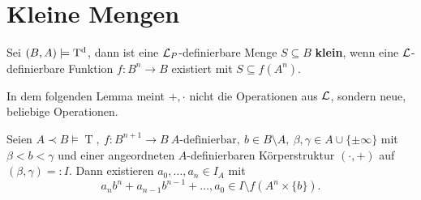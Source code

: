 \section{Kleine Mengen}
\begin{definition}
	Sei $(B,A)\models\operatorname{T^d}$, dann ist eine $\mathcal{L}_P$-definierbare Menge $S\subseteq B$ \textbf{klein}, wenn eine $\mathcal{L}$-definierbare Funktion $f:B^n\rightarrow B$ existiert mit $S\subseteq f(A^n)$.
\end{definition}

\newpage
In dem folgenden Lemma meint $+,\cdot$ nicht die Operationen aus $\mathcal{L}$, sondern neue, beliebige Operationen.

\begin{lemma}\label{Hilfsaussage Kleinheit}
	Seien $A\prec B\models\operatorname{T},\ f:B^{n+1}\rightarrow B\ A\text{-definierbar},\ b\in B\setminus A,\ \beta,\gamma\in A\cup\{\pm\infty\}$ mit $\beta<b<\gamma$ und einer angeordneten $A$-definierbaren Körperstruktur $(\cdot,+)$ auf $(\beta,\gamma)=:I$. Dann existieren $a_0,\dots,a_n\in I_A$ mit $$a_nb^n+a_{n-1}b^{n-1}+\dots,a_0\in I\setminus f(A^n\times\{b\}).$$
\end{lemma}
